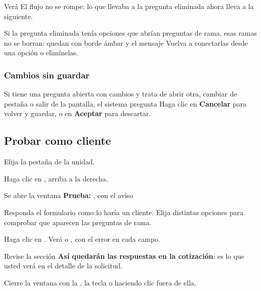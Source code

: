 Verá  El flujo no se rompe: lo que llevaba a la
pregunta eliminada ahora lleva a la siguiente.

\begin{importante}
Si la pregunta eliminada tenía opciones que abrían preguntas de rama, esas ramas no se borran:
quedan con borde ámbar y el mensaje 
Vuelva a conectarlas desde una opción o elimínelas.
\end{importante}

\subsubsection{Cambios sin guardar}

Si tiene una pregunta abierta con cambios y trata de abrir otra, cambiar de pestaña o salir
de la pantalla, el sistema pregunta  Haga clic en \textbf{Cancelar} para volver y guardar, o en
\textbf{Aceptar} para descartar.

\subsection{Probar como cliente}\label{sec:probar}

\begin{pasos}
  \item Elija la pestaña de la unidad.
  \item Haga clic en , arriba a la derecha.
  \item Se abre la ventana \textbf{Prueba: }, con el aviso 
  \item Responda el formulario como lo haría un cliente. Elija distintas opciones para comprobar
        que aparecen las preguntas de rama.
  \item Haga clic en . Verá  o
        , con el error en cada campo.
  \item Revise la sección \textbf{Así quedarán las respuestas en la cotización}: es lo que usted
        verá en el detalle de la solicitud.
  \item Cierre la ventana con la \textbf{\icCerrar}, la tecla  o haciendo clic fuera de ella.
\end{pasos}

